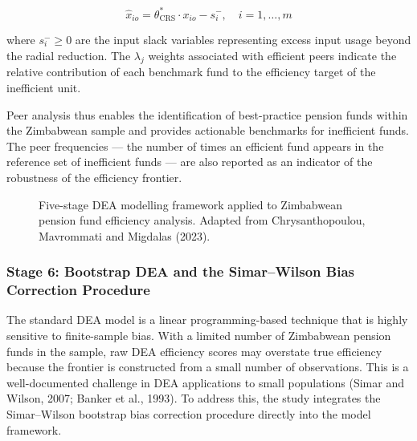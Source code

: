 \documentclass[12pt,a4paper]{article}
\begin{document}
\begin{equation}
\hat{x}_{io} = \theta^*_{\text{CRS}} \cdot x_{io} - s^-_i, \quad i = 1, \ldots, m
\end{equation}

where $s^-_i \geq 0$ are the input slack variables representing excess input usage beyond the radial reduction. The $\lambda_j$ weights associated with efficient peers indicate the relative contribution of each benchmark fund to the efficiency target of the inefficient unit.

Peer analysis thus enables the identification of best-practice pension funds within the Zimbabwean sample and provides actionable benchmarks for inefficient funds. The peer frequencies --- the number of times an efficient fund appears in the reference set of inefficient funds --- are also reported as an indicator of the robustness of the efficiency frontier.

\begin{figure}[H]
\centering
{}
\caption{Five-stage DEA modelling framework applied to Zimbabwean pension fund efficiency analysis. Adapted from Chrysanthopoulou, Mavrommati and Migdalas (2023).}
\label{fig:dea_stages}
\end{figure}

\subsubsection{Stage 6: Bootstrap DEA and the Simar--Wilson Bias Correction Procedure}

The standard DEA model is a linear programming-based technique that is highly sensitive to finite-sample bias. With a limited number of Zimbabwean pension funds in the sample, raw DEA efficiency scores may overstate true efficiency because the frontier is constructed from a small number of observations. This is a well-documented challenge in DEA applications to small populations (Simar and Wilson, 2007; Banker et al., 1993). To address this, the study integrates the Simar--Wilson bootstrap bias correction procedure directly into the model framework.
\end{document}
